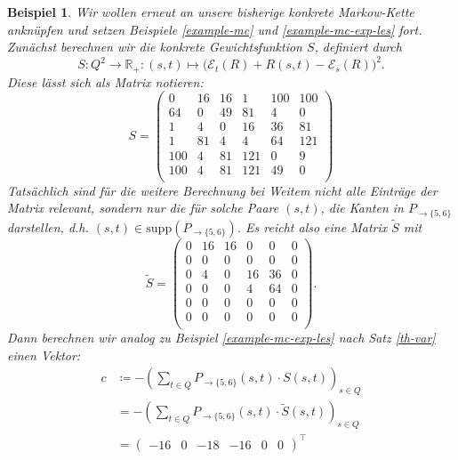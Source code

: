 \documentclass[a4paper]{article}
\newcommand{\mc}{Markow-Kette}
\newtheorem{beispiel}[satz]{Beispiel}
\theoremstyle{nonumberplain}
\begin{document}
\begin{beispiel}\label{example-mc-var-les}
	Wir wollen erneut an unsere bisherige konkrete \mc{} anknüpfen und setzen Beispiele \ref{example-mc} und \ref{example-mc-exp-les} fort.
	Zunächst berechnen wir die konkrete Gewichtsfunktion $S$, definiert durch
	\[
		S: Q^2 \to \mathbb{R}_+ : (s,t) \mapsto \big(\mathcal{E}_{t}(R) + R(s,t) - \mathcal{E}_{s}(R)\big)^2\text{.}
	\]
	Diese lässt sich als Matrix notieren:
	\begin{equation*}
	S = \begin{pmatrix}
			0 & 16 & 16 & 1 & 100 & 100 \\
			64 & 0 & 49 & 81 & 4 & 0 \\
			1 & 4 & 0 & 16 & 36 & 81 \\
			1 & 81 & 4 & 4 & 64 & 121 \\
			100 & 4 & 81 & 121 & 0 & 9 \\
			100 & 4 & 81 & 121 & 49 & 0 \\
		\end{pmatrix}
	\end{equation*}
	Tatsächlich sind für die weitere Berechnung bei Weitem nicht alle Einträge der Matrix relevant, sondern nur die für solche Paare $(s,t)$, die Kanten in $P_{\rightarrow \{5,6\}}$ darstellen, d.h. $(s,t) \in \mathrm{supp}(P_{\rightarrow \{5,6\}})$. Es reicht also eine Matrix $\tilde{S}$ mit
	\begin{equation*}
		\tilde{S} = \begin{pmatrix}
			0 & 16 & 16 & 0 & 0 & 0 \\
			0 & 0 & 0 & 0 & 0 & 0 \\
			0 & 4 & 0 & 16 & 36 & 0 \\
			0 & 0 & 0 & 4 & 64 & 0 \\
			0 & 0 & 0 & 0 & 0 & 0 \\
			0 & 0 & 0 & 0 & 0 & 0 \\
		\end{pmatrix}\text{.}
	\end{equation*}
		Dann berechnen wir analog zu Beispiel \ref{example-mc-exp-les} nach Satz \ref{th-var} einen Vektor:
	\begin{align*}
	c &\coloneqq - \left(\sum_{t \in Q}{ P_{\rightarrow \{5,6\}}(s,t) \cdot S(s,t) }\right)_{s \in Q} \\
	&= - \left(\sum_{t \in Q}{ P_{\rightarrow \{5,6\}}(s,t) \cdot \tilde{S}(s,t) }\right)_{s \in Q} \\
	&= \begin{pmatrix} -16 & 0 & -18 & -16 & 0 & 0 \end{pmatrix}^\intercal

\end{align*}
\end{beispiel}
\end{document}
